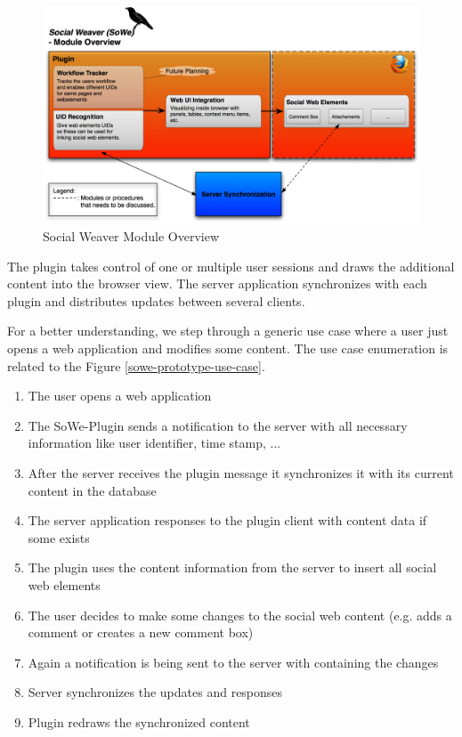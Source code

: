 \begin{figure}\centering
		\includegraphics[width=13cm]{images/sowe-module-overview.png}
		\caption{Social Weaver Module Overview}
		\label{msowe-module-overview}
\end{figure} 

The plugin takes control of one or multiple user sessions and draws the additional content into the browser view. The server application synchronizes with each plugin and distributes updates between several clients. 

For a better understanding, we step through a generic use case where a user just opens a web application and modifies some content. The use case enumeration is related to the Figure \ref{sowe-prototype-use-case}.

\begin{enumerate}
\item The user opens a web application
\item The SoWe-Plugin sends a notification to the server with all necessary information like user identifier, time stamp, ...
\item After the server receives the plugin message it synchronizes it with its current content in the database
\item The server application responses to the plugin client with content data if some exists
\item The plugin uses the content information from the server to insert all social web elements
\item The user decides to make some changes to the social web content (e.g. adds a comment or creates a new comment box)
\item Again a notification is being sent to the server with containing the changes
\item Server synchronizes the updates and responses
\item Plugin redraws the synchronized content
\end{enumerate}

